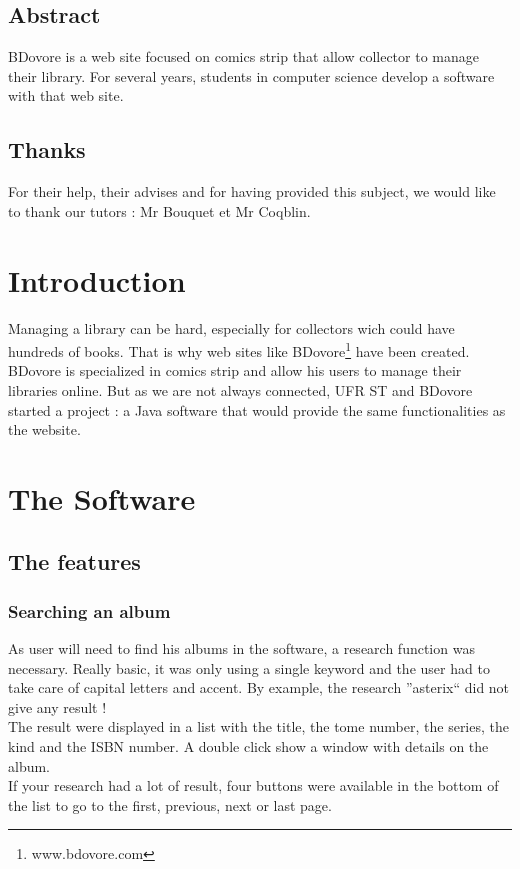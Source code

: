\documentclass[11pt]{report} %
\begin{document}

\newpage

\section*{Abstract}
BDovore is a web site focused on comics strip that allow collector to manage their library. For several years, students in computer science develop a software with that web site.  
\newpage

\section*{Thanks}
For their help, their advises and for having provided this subject, we would like to thank our tutors : Mr Bouquet et Mr Coqblin.
\newpage

\tableofcontents
\newpage

\chapter*{Introduction}
Managing a library can be hard, especially for collectors wich could have hundreds of books. That is why web sites like BDovore\footnote{www.bdovore.com} have been created. BDovore is specialized in comics strip and allow his users to manage their libraries online. But as we are not always connected, UFR ST and BDovore started a project : a Java software that would provide the same functionalities as the website.


\chapter{The Software}

\section{The features}
\subsection{Searching an album}
As user will need to find his albums in the software, a research function was necessary. Really basic, it was only using a single keyword and the user had to take care of capital letters and accent. By example, the research ''asterix`` did not give any result !\\
The result were displayed in a list with the title, the tome number, the series, the kind and the ISBN number. A double click show a window with details on the album.\\
If your research had a lot of result, four buttons were available in the bottom of the list to go to the first, previous, next or last page.
\end{document}
